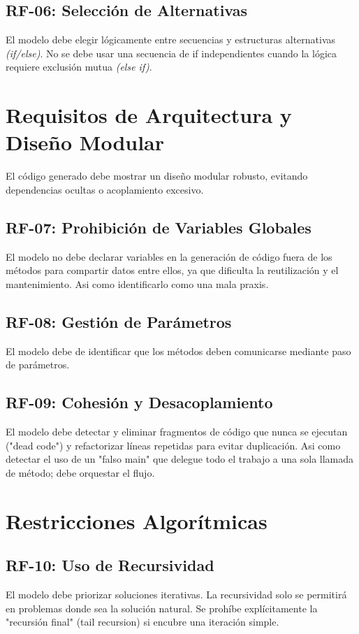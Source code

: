 \subsection{RF-06: Selección de Alternativas}{
El modelo debe elegir lógicamente entre secuencias y estructuras alternativas \textit{(if/else)}. No se debe usar una secuencia de if independientes cuando la lógica requiere exclusión mutua \textit{(else if)}.
}

\section{Requisitos de Arquitectura y Diseño Modular}
El código generado debe mostrar un diseño modular robusto, evitando dependencias ocultas o acoplamiento excesivo.

\subsection{RF-07: Prohibición de Variables Globales}{
El modelo no debe declarar variables en la generación de código fuera de los métodos para compartir datos entre ellos, ya que dificulta la reutilización y el mantenimiento. Asi como identificarlo como una mala praxis.
}

\subsection{RF-08: Gestión de Parámetros}{
El modelo debe de identificar que los métodos deben comunicarse mediante paso de parámetros.
}

\subsection{RF-09: Cohesión y Desacoplamiento}{
El modelo debe detectar y eliminar fragmentos de código que nunca se ejecutan ("dead code") y refactorizar líneas repetidas para evitar duplicación. Asi como detectar el uso de un "falso main" que delegue todo el trabajo a una sola llamada de método; debe orquestar el flujo.
}

\section{Restricciones Algorítmicas}

\subsection{RF-10: Uso de Recursividad}
El modelo debe priorizar soluciones iterativas. La recursividad solo se permitirá en problemas donde sea la solución natural. Se prohíbe explícitamente la "recursión final" (tail recursion) si encubre una iteración simple.


